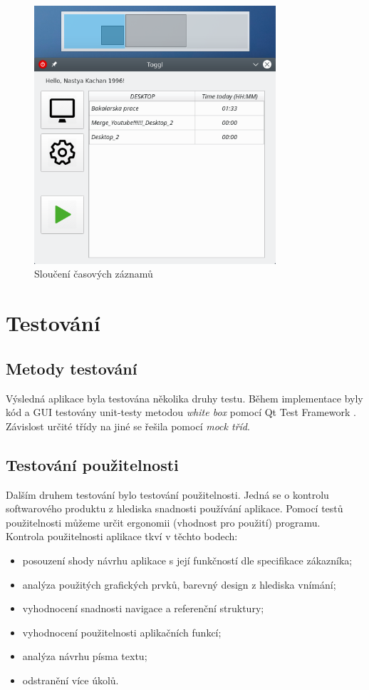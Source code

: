 \documentclass[thesis=B,czech]{FITthesis}[2012/06/26]
\begin{document}
\begin{figure}[h]\centering
	\includegraphics[width=0.8\textwidth]{toggl_merging.png}
	\caption[Sloučení časových záznamů]{Sloučení časových záznamů}\label{fig:t_merg}
\end{figure}

\chapter{Testování}

\section{Metody testování}

Výsledná aplikace byla testována několika druhy testu. Během implementace byly kód a GUI testovány unit-testy \cite{gui_t} metodou \textit{white box} pomocí Qt Test Framework \cite{qt_test_d}. Závislost určité třídy na jiné se řešila pomocí \textit{mock tříd}. 

\section{Testování použitelnosti}
Dalším druhem testování bylo testování použitelnosti. Jedná se o kontrolu softwarového produktu z hlediska snadnosti používání aplikace. Pomocí testů použitelnosti můžeme určit ergonomii (vhodnost pro použití) programu. \\
Kontrola použitelnosti aplikace tkví v těchto bodech:
\begin{itemize} 
	\item posouzení shody návrhu aplikace s její funkčností dle specifikace zákazníka;
	\item analýza použitých grafických prvků, barevný design z hlediska vnímání;
	\item vyhodnocení snadnosti navigace a referenční struktury;
	\item vyhodnocení použitelnosti aplikačních funkcí;
	\item analýza návrhu písma textu;
	\item odstranění více úkolů.
\end{itemize} 
\end{document}
